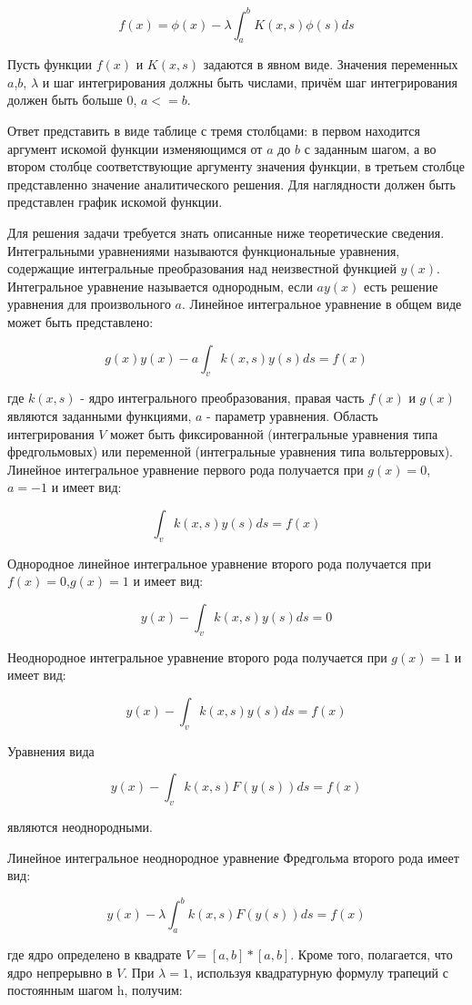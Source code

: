 $$f(x)=\phi(x)-\lambda \int_a^b K(x,s)\phi(s)ds$$

Пусть функции $f(x)$ и $K(x,s)$ задаются в явном виде. Значения переменных $a$,$b$, $\lambda$ и шаг интегрирования должны быть числами, причём шаг интегрирования должен быть больше 0, $a<=b$.

Ответ представить в виде таблице с тремя столбцами: в первом находится аргумент искомой функции изменяющимся от $a$ до $b$ с заданным шагом, а во втором столбце соответствующие аргументу значения функции, в третьем столбце представленно значение аналитического решения. Для наглядности должен быть представлен график искомой функции.

Для решения задачи требуется знать описанные ниже теоретические сведения. Интегральными уравнениями называются функциональные уравнения, содержащие интегральные преобразования над неизвестной функцией $y(x)$. Интегральное уравнение называется однородным, если $ay(x)$ есть решение уравнения для произвольного $a$. Линейное интегральное уравнение в общем виде может быть представлено: 

$$g(x)y(x)-a\int_v k(x,s)y(s)ds=f(x)$$
	 
где $k(x,s)$ - ядро интегрального преобразования, правая часть $f(x)$ и $g(x)$ являются заданными функциями, $a$ - параметр уравнения. Область интегрирования $V$ может быть фиксированной (интегральные уравнения типа фредгольмовых) или переменной (интегральные уравнения типа вольтерровых). 
Линейное интегральное уравнение первого рода получается при $g(x)=0$, $a=-1$ и имеет вид: 
	 
     $$\int_v k(x,s)y(s)ds=f(x)$$

Однородное линейное интегральное уравнение второго рода получается при $f(x)=0$,$g(x)=1$ и имеет вид: 
	 
$$y(x)-\int_v k(x,s)y(s)ds=0$$

Неоднородное интегральное уравнение второго рода получается при $g(x)=1$ и имеет вид: 
	 
$$y(x)-\int_v k(x,s)y(s)ds=f(x)$$

Уравнения вида 
	 
$$y(x)-\int_v k(x,s)F(y(s))ds=f(x)$$


являются неоднородными. 

Линейное интегральное неоднородное уравнение Фредгольма второго рода имеет вид: 
	 
$$y(x)-\lambda\int_a^b k(x,s)F(y(s))ds=f(x)$$

где ядро определено в квадрате $V=[a,b]*[a,b]$. Кроме того, полагается, что ядро непрерывно в $V$. При  $\lambda=1$, используя квадратурную формулу трапеций с постоянным шагом h, получим: 
	 

